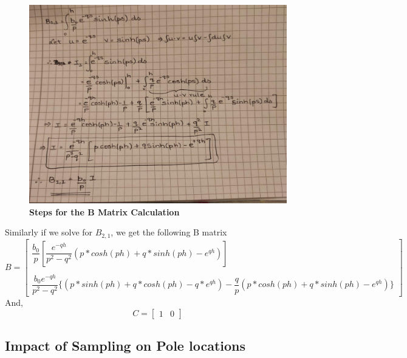 \documentclass[a4paper,12pt]{article}
\begin{document}
\begin{figure}[H]
\centering
\includegraphics[scale=0.4]{image_2.jpeg}
\caption{\textbf{Steps for the B Matrix Calculation}}
\label{B_cal}
\end{figure}
Similarly if we solve for $B_{2,1}$, we get the following B matrix
\begin{equation}
\boxed{
B = \begin{bmatrix}
\dfrac{b_0}{p}[\dfrac{e^{-qh}}{p^2-q^2}(p*cosh(ph)+q*sinh(ph)-e^{qh})] \\ \\
\dfrac{b_0 e^{-qh}}{p^2-q^2}\{(p*sinh(ph)+q*cosh(ph)-q*e^{qh}) - \dfrac{q}{p}(p*cosh(ph)+q*sinh(ph)-e^{qh})\}
\end{bmatrix}}
\end{equation}
And, \begin{equation}
\boxed{
C = \begin{bmatrix}
1 & 0
\end{bmatrix}
}
\end{equation}
	\subsection{Impact of Sampling on Pole locations}
\end{document}
